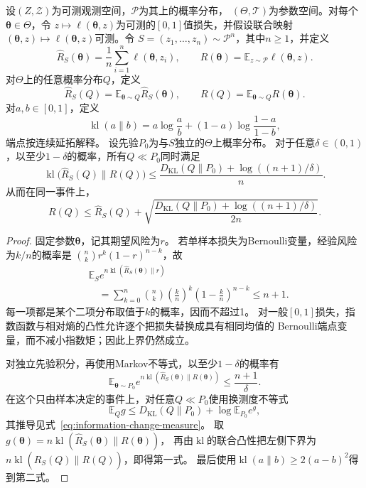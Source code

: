 \begin{theorem}
\label{thm:pac-bayes-bound}
设$(Z,\mathcal Z)$为可测观测空间，$\mathcal P$为其上的概率分布，
$(\Theta,\mathcal T)$为参数空间。对每个$\bm\theta\in\Theta$，令
$z\mapsto\ell(\bm\theta,z)$为可测的$[0,1]$值损失，并假设联合映射
$(\bm\theta,z)\mapsto\ell(\bm\theta,z)$可测。令
$S=(z_1,\ldots,z_n)\sim\mathcal P^n$，其中$n\geq1$，并定义
\[
 \hat R_S(\bm\theta)=\frac1n\sum_{i=1}^n\ell(\bm\theta,z_i),
 \qquad
 R(\bm\theta)=\mathbb E_{z\sim\mathcal P}\ell(\bm\theta,z).
\]
对$\Theta$上的任意概率分布$Q$，定义
\[
 \hat R_S(Q)=\mathbb E_{\bm\theta\sim Q}\hat R_S(\bm\theta),
 \qquad
 R(Q)=\mathbb E_{\bm\theta\sim Q}R(\bm\theta).
\]
对$a,b\in[0,1]$，定义
\[
 \operatorname{kl}(a\|b)
 =a\log\frac ab+(1-a)\log\frac{1-a}{1-b},
\]
端点按连续延拓解释。
设先验$P_0$为与$S$独立的$\Theta$上概率分布。
对于任意$\delta\in(0,1)$，以至少$1-\delta$的概率，所有$Q\ll P_0$同时满足
\begin{equation}
 \operatorname{kl}\bigl(\hat R_S(Q)\|R(Q)\bigr)
 \leq\frac{D_{\mathrm{KL}}(Q\|P_0)+\log((n+1)/\delta)}{n}.
 \label{eq:pac-bayes-kl}
\end{equation}
从而在同一事件上，
\[
 R(Q)\leq\hat R_S(Q)+
 \sqrt{\frac{D_{\mathrm{KL}}(Q\|P_0)+\log((n+1)/\delta)}{2n}}.
\]
\end{theorem}
\begin{proof}
固定参数$\bm\theta$，记其期望风险为$r$。
若单样本损失为Bernoulli变量，经验风险为$k/n$的概率是
$\binom nk r^k(1-r)^{n-k}$，故
\[
 \begin{aligned}
 &\mathbb E_S e^{n\operatorname{kl}(\hat R_S(\bm\theta)\|r)}\\
 &\quad=\sum_{k=0}^n\binom nk
       \left(\frac kn\right)^k\left(1-\frac kn\right)^{n-k}
 \leq n+1.
 \end{aligned}
\]
每一项都是某个二项分布取值于$k$的概率，因而不超过1。
对一般$[0,1]$损失，指数函数与相对熵的凸性允许逐个把损失替换成具有相同均值的
Bernoulli端点变量，而不减小指数矩；因此上界仍然成立。

对独立先验积分，再使用Markov不等式，以至少$1-\delta$的概率有
\[
 \mathbb E_{\bm\theta\sim P_0}
 e^{n\operatorname{kl}(\hat R_S(\bm\theta)\|R(\bm\theta))}
 \leq\frac{n+1}{\delta}.
\]
在这个只由样本决定的事件上，对任意$Q\ll P_0$使用换测度不等式
\begin{equation}
 \mathbb E_Q g\leq D_{\mathrm{KL}}(Q\|P_0)+\log\mathbb E_{P_0}e^g,
 \label{eq:change-of-measure}
\end{equation}
其推导见式~\eqref{eq:information-change-measure}。
取$g(\bm\theta)=n\operatorname{kl}(\hat R_S(\bm\theta)\|R(\bm\theta))$，
再由$\operatorname{kl}$的联合凸性把左侧下界为
$n\operatorname{kl}(\hat R_S(Q)\|R(Q))$，即得第一式。
最后使用$\operatorname{kl}(a\|b)\geq2(a-b)^2$得到第二式。
\end{proof}

